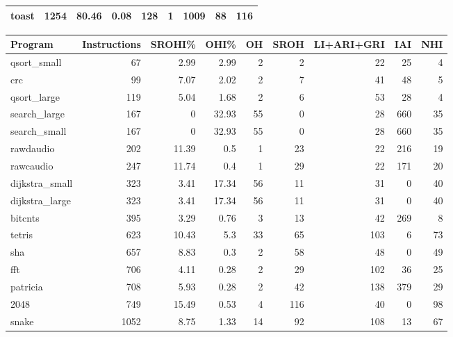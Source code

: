 \begin{tabular}{lrrrrrrrr}
 toast          &     1254 &    80.46 &   0.08 &  128 &    1 &   1009 &    88 &   116 \\
\hline
\end{tabular}\begin{tabular}{lrrrrrrrr}
\hline
 Program        &   Instructions &   SROHI\% &   OHI\% &   OH &   SROH &   LI+ARI+GRI &   IAI &   NHI \\
\hline
 qsort\_small    &             67 &     2.99 &   2.99 &    2 &      2 &           22 &    25 &     4 \\
 crc            &             99 &     7.07 &   2.02 &    2 &      7 &           41 &    48 &     5 \\
 qsort\_large    &            119 &     5.04 &   1.68 &    2 &      6 &           53 &    28 &     4 \\
 search\_large   &            167 &     0    &  32.93 &   55 &      0 &           28 &   660 &    35 \\
 search\_small   &            167 &     0    &  32.93 &   55 &      0 &           28 &   660 &    35 \\
 rawdaudio      &            202 &    11.39 &   0.5  &    1 &     23 &           22 &   216 &    19 \\
 rawcaudio      &            247 &    11.74 &   0.4  &    1 &     29 &           22 &   171 &    20 \\
 dijkstra\_small &            323 &     3.41 &  17.34 &   56 &     11 &           31 &     0 &    40 \\
 dijkstra\_large &            323 &     3.41 &  17.34 &   56 &     11 &           31 &     0 &    40 \\
 bitcnts        &            395 &     3.29 &   0.76 &    3 &     13 &           42 &   269 &     8 \\
 tetris         &            623 &    10.43 &   5.3  &   33 &     65 &          103 &     6 &    73 \\
 sha            &            657 &     8.83 &   0.3  &    2 &     58 &           48 &     0 &    49 \\
 fft            &            706 &     4.11 &   0.28 &    2 &     29 &          102 &    36 &    25 \\
 patricia       &            708 &     5.93 &   0.28 &    2 &     42 &          138 &   379 &    29 \\
 2048           &            749 &    15.49 &   0.53 &    4 &    116 &           40 &     0 &    98 \\
 snake          &           1052 &     8.75 &   1.33 &   14 &     92 &          108 &    13 &    67 \\

\end{tabular}
